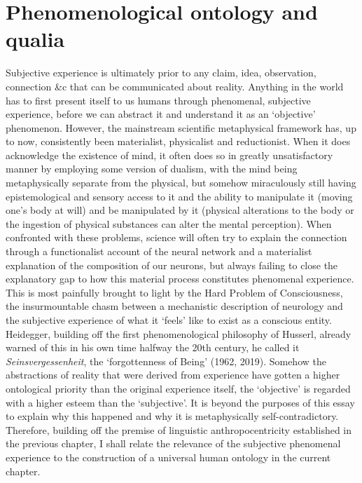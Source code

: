  

\section{Phenomenological ontology and qualia} 

Subjective experience is ultimately prior to any claim, idea, observation, connection \&c that can be communicated about reality. Anything in the world has to first present itself to us humans through phenomenal, subjective experience, before we can abstract it and understand it as an ‘objective’ phenomenon. However, the mainstream scientific metaphysical framework has, up to now, consistently been materialist, physicalist and reductionist. When it does acknowledge the existence of mind, it often does so in greatly unsatisfactory manner by employing some version of dualism, with the mind being metaphysically separate from the physical, but somehow miraculously still having epistemological and sensory access to it and the ability to manipulate it (moving one’s body at will) and be manipulated by it (physical alterations to the body or the ingestion of physical substances can alter the mental perception). When confronted with these problems, science will often try to explain the connection through a functionalist account of the neural network and a materialist explanation of the composition of our neurons, but always failing to close the explanatory gap to how this material process constitutes phenomenal experience. This is most painfully brought to light by the Hard Problem of Consciousness, the insurmountable chasm between a mechanistic description of neurology and the subjective experience of what it ‘feels’ like to exist as a conscious entity. Heidegger, building off the first phenomenological philosophy of Husserl, already warned of this in his own time halfway the 20th century, he called it \textit{Seinsvergessenheit}, the ‘forgottenness of Being’ (1962, 2019). Somehow the abstractions of reality that were derived from experience have gotten a higher ontological priority than the original experience itself, the ‘objective’ is regarded with a higher esteem than the ‘subjective’. It is beyond the purposes of this essay to explain why this happened and why it is metaphysically self-contradictory. Therefore, building off the premise of linguistic anthropocentricity established in the previous chapter, I shall relate the relevance of the subjective phenomenal experience to the construction of a universal human ontology in the current chapter. 

